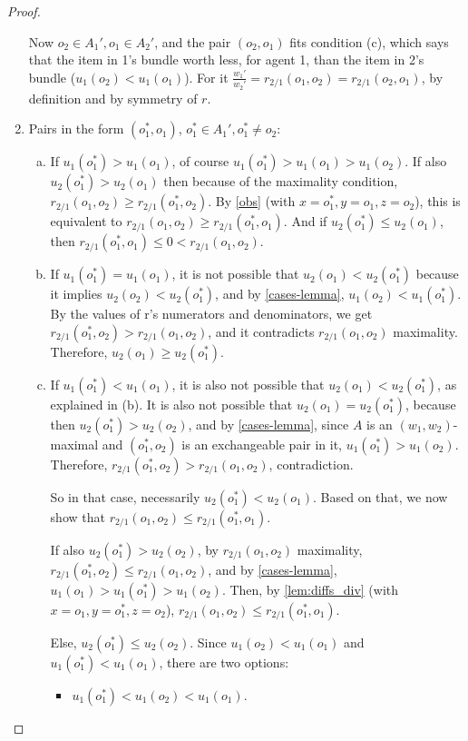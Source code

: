 \documentclass[sigconf]{aamas}
\theoremstyle{definition}
\begin{document}
\begin{proof}
\begin{enumerate}
    Now $o_2\in A_1', o_1\in A_2'$, and the pair $(o_2,o_1)$ fits condition (c), which says that the item in 1's bundle worth less, for agent 1, than the item in 2's bundle ($u_1(o_2) < u_1(o_1)$).
    For it $\frac{w_1'}{w_2'} = r_{2/1}(o_1,o_2) = r_{2/1}(o_2,o_1)$, by definition and by symmetry of $r$.

    \item Pairs in the form $(o_1^*,o_1)$, $o_1^*\in A_1', o_1^* \neq o_2$:
    \begin{enumerate}[(a)] 
    
    \item If $u_1(o_1^*)>u_1(o_1)$, of course $u_1(o_1^*)>u_1(o_1)>u_1(o_2)$.
        If also $u_2(o_1^*)>u_2(o_1)$ then because of the maximality condition, 
        $r_{2/1}(o_1,o_2)\geq r_{2/1}(o_1^*,o_2)$.
        By \ref{obs} (with $x=o_1^*, y=o_1, z=o_2$), this is equivalent to 
        $r_{2/1}(o_1,o_2)\geq r_{2/1}(o_1^*,o_1)$.
        And if $u_2(o_1^*)\leq u_2(o_1)$, then $r_{2/1}(o_1^*,o_1) \leq 0 < r_{2/1}(o_1,o_2)$.
    
\item If $u_1(o_1^*)=u_1(o_1)$,
it is not possible that $u_2(o_1)<u_2(o_1^*)$ because it implies $u_2(o_2)<u_2(o_1^*)$, and by \ref{cases-lemma}, $u_1(o_2)<u_1(o_1^*)$.
By the values of r's numerators and denominators, we get $r_{2/1}(o_1^*,o_2) > r_{2/1}(o_1,o_2)$, and it contradicts $r_{2/1}(o_1,o_2)$ maximality. 
Therefore, $u_2(o_1)\geq u_2(o_1^*)$.
    
\item If $u_1(o_1^*)<u_1(o_1)$,
it is also not possible that $u_2(o_1) < u_2(o_1^*)$, as explained in (b). It is also not 
possible that $u_2(o_1) = u_2(o_1^*)$,
because then $u_2(o_1^*) > u_2(o_2)$, and by \ref{cases-lemma}, since $A$ is an $(w_1,w_2)$-maximal and $(o_1^*,o_2)$ is an exchangeable pair in it, $u_1(o_1^*)>u_1(o_2)$. Therefore, $r_{2/1}(o_1^*,o_2) > r_{2/1}(o_1,o_2)$, contradiction. 
    
So in that case, necessarily $u_2(o_1^*)<u_2(o_1)$. 
        Based on that, we now show that $r_{2/1}(o_1,o_2) \leq r_{2/1}(o_1^*,o_1)$.
    
        If also $u_2(o_1^*) > u_2(o_2)$, by $r_{2/1}(o_1,o_2)$ maximality, $r_{2/1}(o_1^*,o_2) \leq r_{2/1}(o_1,o_2)$, 
        and by \ref{cases-lemma}, $u_1(o_1) > u_1(o_1^*) > u_1(o_2)$.
        Then, by \ref{lem:diffs_div} (with $x=o_1,y=o_1^*,z=o_2$), $r_{2/1}(o_1,o_2) \leq r_{2/1}(o_1^*,o_1)$.
        
        Else, $u_2(o_1^*) \leq u_2(o_2)$. Since $u_1(o_2)<u_1(o_1)$ and $u_1(o_1^*)<u_1(o_1)$, there are two options:
\begin{itemize}
\item $u_1(o_1^*)<u_1(o_2)<u_1(o_1)$.


\end{itemize}
\end{enumerate}
\end{enumerate}
\end{proof}
\end{document}
